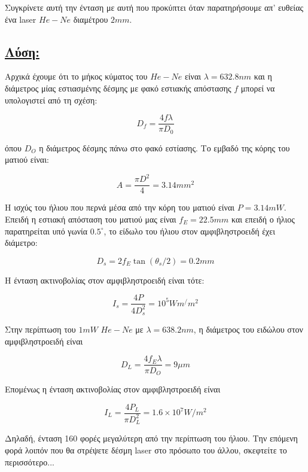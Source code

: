 \documentclass[a4paper,11pt,titlepage]{article}
\newcommand{\degrees}{^{\circ}}
\numberwithin{equation}{section} %
\begin{document}
Συγκρίνετε αυτή την ένταση με αυτή που προκύπτει όταν παρατηρήσουμε απ' ευθείας ένα laser $He-Ne$ διαμέτρου $2mm$.

\subsection*{\underline{Λύση:}}

Αρχικά έχουμε ότι το μήκος κύματος του $He-Ne$ είναι $\lambda=632.8nm$ και η διάμετρος μίας εστιασμένης δέσμης με φακό εστιακής απόστασης $f$ μπορεί να υπολογιστεί από τη σχέση:

\begin{equation}
 D_f=\dfrac{4f\lambda}{\pi D_0}
\end{equation}

όπου $D_O$ η διάμετρος δέσμης πάνω στο φακό εστίασης. Το εμβαδό της κόρης του ματιού είναι:

\begin{equation}
 A=\dfrac{\pi D^2}{4}=3.14mm^2
\end{equation}

Η ισχύς του ήλιου που περνά μέσα από την κόρη του ματιού είναι $P=3.14mW$. Επειδή η εστιακή απόσταση του ματιού μας είναι $f_E=22.5mm$ και επειδή ο ήλιος παρατηρείται υπό γωνία $0.5\degrees$, το είδωλο του ήλιου στον αμφιβληστροειδή έχει διάμετρο:

\begin{equation}
 D_s=2f_E\tan(\theta_s/2)=0.2mm
\end{equation}


Η ένταση ακτινοβολίας στον αμφιβληστροειδή είναι τότε:

\begin{equation}
 I_s=\dfrac{4P}{4D_s^2}=10^5Wm^/m^2
\end{equation}

Στην περίπτωση του $1mW$ $He-Ne$ με $\lambda=638.2nm$, η διάμετρος του ειδώλου στον αμφιβληστροειδή είναι

\begin{equation}
 D_L=\dfrac{4f_E\lambda}{\pi D_O}=9\mu m
\end{equation}

Επομένως η ένταση ακτινοβολίας στον αμφιβληστροειδή είναι 

\begin{equation}
 I_L=\dfrac{4P_L}{\pi D_L^2}=1.6\times10^7W/m^2
\end{equation}

Δηλαδή, ένταση 160 φορές μεγαλύτερη από την περίπτωση του ήλιου. Την επόμενη φορά λοιπόν που θα στρέψετε δέσμη laser στο πρόσωπο του άλλου, σκεφτείτε το περισσότερο...
\end{document}
